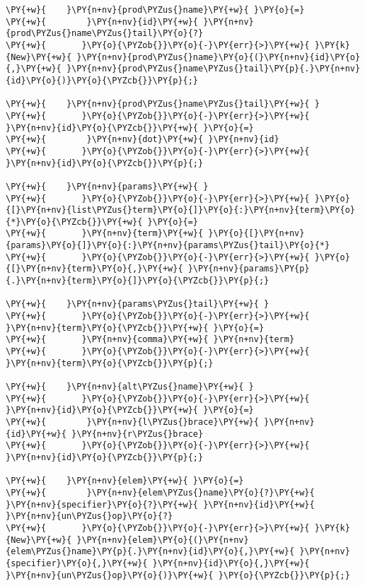 \begin{Verbatim}[commandchars=\\\{\}]
\PY{+w}{    }\PY{n+nv}{prod\PYZus{}name}\PY{+w}{ }\PY{o}{=}
\PY{+w}{        }\PY{n+nv}{id}\PY{+w}{ }\PY{n+nv}{prod\PYZus{}name\PYZus{}tail}\PY{o}{?}
\PY{+w}{	   }\PY{o}{\PYZob{}}\PY{o}{-}\PY{err}{>}\PY{+w}{ }\PY{k}{New}\PY{+w}{ }\PY{n+nv}{prod\PYZus{}name}\PY{o}{(}\PY{n+nv}{id}\PY{o}{,}\PY{+w}{ }\PY{n+nv}{prod\PYZus{}name\PYZus{}tail}\PY{p}{.}\PY{n+nv}{id}\PY{o}{)}\PY{o}{\PYZcb{}}\PY{p}{;}

\PY{+w}{    }\PY{n+nv}{prod\PYZus{}name\PYZus{}tail}\PY{+w}{ }
\PY{+w}{	   }\PY{o}{\PYZob{}}\PY{o}{-}\PY{err}{>}\PY{+w}{ }\PY{n+nv}{id}\PY{o}{\PYZcb{}}\PY{+w}{ }\PY{o}{=}
\PY{+w}{        }\PY{n+nv}{dot}\PY{+w}{ }\PY{n+nv}{id}
\PY{+w}{	   }\PY{o}{\PYZob{}}\PY{o}{-}\PY{err}{>}\PY{+w}{ }\PY{n+nv}{id}\PY{o}{\PYZcb{}}\PY{p}{;}

\PY{+w}{    }\PY{n+nv}{params}\PY{+w}{ }
\PY{+w}{	   }\PY{o}{\PYZob{}}\PY{o}{-}\PY{err}{>}\PY{+w}{ }\PY{o}{[}\PY{n+nv}{list\PYZus{}term}\PY{o}{]}\PY{o}{:}\PY{n+nv}{term}\PY{o}{*}\PY{o}{\PYZcb{}}\PY{+w}{ }\PY{o}{=}
\PY{+w}{       }\PY{n+nv}{term}\PY{+w}{ }\PY{o}{[}\PY{n+nv}{params}\PY{o}{]}\PY{o}{:}\PY{n+nv}{params\PYZus{}tail}\PY{o}{*}
\PY{+w}{	   }\PY{o}{\PYZob{}}\PY{o}{-}\PY{err}{>}\PY{+w}{ }\PY{o}{[}\PY{n+nv}{term}\PY{o}{,}\PY{+w}{ }\PY{n+nv}{params}\PY{p}{.}\PY{n+nv}{term}\PY{o}{]}\PY{o}{\PYZcb{}}\PY{p}{;}

\PY{+w}{    }\PY{n+nv}{params\PYZus{}tail}\PY{+w}{ }
\PY{+w}{	   }\PY{o}{\PYZob{}}\PY{o}{-}\PY{err}{>}\PY{+w}{ }\PY{n+nv}{term}\PY{o}{\PYZcb{}}\PY{+w}{ }\PY{o}{=}
\PY{+w}{       }\PY{n+nv}{comma}\PY{+w}{ }\PY{n+nv}{term}
\PY{+w}{	   }\PY{o}{\PYZob{}}\PY{o}{-}\PY{err}{>}\PY{+w}{ }\PY{n+nv}{term}\PY{o}{\PYZcb{}}\PY{p}{;}

\PY{+w}{    }\PY{n+nv}{alt\PYZus{}name}\PY{+w}{ }
\PY{+w}{	   }\PY{o}{\PYZob{}}\PY{o}{-}\PY{err}{>}\PY{+w}{ }\PY{n+nv}{id}\PY{o}{\PYZcb{}}\PY{+w}{ }\PY{o}{=}
\PY{+w}{        }\PY{n+nv}{l\PYZus{}brace}\PY{+w}{ }\PY{n+nv}{id}\PY{+w}{ }\PY{n+nv}{r\PYZus{}brace}
\PY{+w}{	   }\PY{o}{\PYZob{}}\PY{o}{-}\PY{err}{>}\PY{+w}{ }\PY{n+nv}{id}\PY{o}{\PYZcb{}}\PY{p}{;}

\PY{+w}{    }\PY{n+nv}{elem}\PY{+w}{ }\PY{o}{=}
\PY{+w}{        }\PY{n+nv}{elem\PYZus{}name}\PY{o}{?}\PY{+w}{ }\PY{n+nv}{specifier}\PY{o}{?}\PY{+w}{ }\PY{n+nv}{id}\PY{+w}{ }\PY{n+nv}{un\PYZus{}op}\PY{o}{?}
\PY{+w}{	   }\PY{o}{\PYZob{}}\PY{o}{-}\PY{err}{>}\PY{+w}{ }\PY{k}{New}\PY{+w}{ }\PY{n+nv}{elem}\PY{o}{(}\PY{n+nv}{elem\PYZus{}name}\PY{p}{.}\PY{n+nv}{id}\PY{o}{,}\PY{+w}{ }\PY{n+nv}{specifier}\PY{o}{,}\PY{+w}{ }\PY{n+nv}{id}\PY{o}{,}\PY{+w}{ }\PY{n+nv}{un\PYZus{}op}\PY{o}{)}\PY{+w}{ }\PY{o}{\PYZcb{}}\PY{p}{;}


\end{Verbatim}
